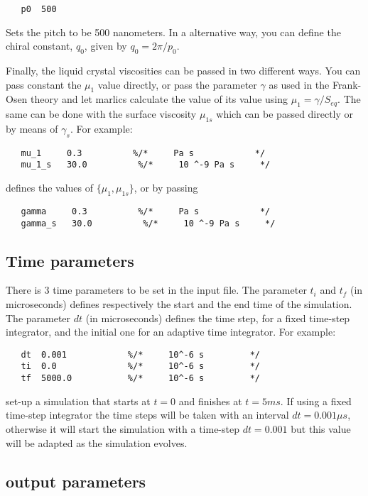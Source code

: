 \documentclass{article}
\begin{document}
\begin{lstlisting}
   p0  500
\end{lstlisting}
Sets the pitch to be 500 nanometers.  In a alternative way, you can
define the chiral constant, $q_0$, given by $q_0=2 \pi /p_0$. 

Finally, the liquid crystal viscosities can be passed in two different
ways. You can pass constant the $\mu_1$ value directly, or pass the
parameter $\gamma$ as used in the Frank-Osen theory and let marlics
calculate the value of its value using $\mu_1=\gamma/S_{eq}$. The same can be done with the surface
viscosity $\mu_{1s}$ which can be passed directly or by means of $\gamma_s$. For example:
\begin{lstlisting}
   mu_1     0.3          %/*     Pa s            */
   mu_1_s   30.0          %/*     10 ^-9 Pa s     */
\end{lstlisting}
defines the values of $\lbrace \mu_1,\mu_{1s} \rbrace$, or by passing  
\begin{lstlisting}
   gamma     0.3          %/*     Pa s            */
   gamma_s   30.0          %/*     10 ^-9 Pa s     */
\end{lstlisting}


\subsection{Time parameters}\label{time.param}

There is 3 time parameters to be set in the input file. The parameter
$t_i$ and $t_f$ (in microseconds) defines respectively the start and
the end time of the simulation. The parameter $dt$ (in microseconds)
defines the time step, for a fixed time-step integrator, and the
initial one for an adaptive time integrator.  For example:
\begin{lstlisting}
   dt  0.001            %/*     10^-6 s         */	
   ti  0.0              %/*     10^-6 s         */	
   tf  5000.0           %/*     10^-6 s         */
\end{lstlisting}
set-up a simulation that starts at $t=0$ and finishes at $t=5 ms$. If
using a fixed time-step integrator the time steps will be taken with
an interval $dt=0.001 \mu s$, otherwise it will start the simulation
with a time-step $dt=0.001$ but this value will be adapted as the
simulation evolves.

\subsection{output parameters}\label{snapshot.param}
\end{document}
